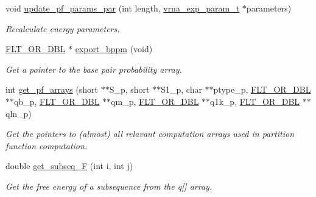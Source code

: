 \begin{DoxyCompactItemize}
void \mbox{\hyperlink{group__part__func__global__deprecated_gaafe2d1b21f5418b123b088aa395e827d}{update\+\_\+pf\+\_\+params\+\_\+par}} (int length, \mbox{\hyperlink{group__energy__parameters_ga01d8b92fe734df8d79a6169482c7d8d8}{vrna\+\_\+exp\+\_\+param\+\_\+t}} $\ast$parameters)
\begin{DoxyCompactList}\small\item\em Recalculate energy parameters. \end{DoxyCompactList}\item 
\mbox{\hyperlink{group__data__structures_ga31125aeace516926bf7f251f759b6126}{F\+L\+T\+\_\+\+O\+R\+\_\+\+D\+BL}} $\ast$ \mbox{\hyperlink{group__part__func__global__deprecated_gac5ac7ee281aae1c5cc5898a841178073}{export\+\_\+bppm}} (void)
\begin{DoxyCompactList}\small\item\em Get a pointer to the base pair probability array. \end{DoxyCompactList}\item 
int \mbox{\hyperlink{group__part__func__global__deprecated_ga42faebdfce6f070c5f89adfc8427525c}{get\+\_\+pf\+\_\+arrays}} (short $\ast$$\ast$S\+\_\+p, short $\ast$$\ast$S1\+\_\+p, char $\ast$$\ast$ptype\+\_\+p, \mbox{\hyperlink{group__data__structures_ga31125aeace516926bf7f251f759b6126}{F\+L\+T\+\_\+\+O\+R\+\_\+\+D\+BL}} $\ast$$\ast$qb\+\_\+p, \mbox{\hyperlink{group__data__structures_ga31125aeace516926bf7f251f759b6126}{F\+L\+T\+\_\+\+O\+R\+\_\+\+D\+BL}} $\ast$$\ast$qm\+\_\+p, \mbox{\hyperlink{group__data__structures_ga31125aeace516926bf7f251f759b6126}{F\+L\+T\+\_\+\+O\+R\+\_\+\+D\+BL}} $\ast$$\ast$q1k\+\_\+p, \mbox{\hyperlink{group__data__structures_ga31125aeace516926bf7f251f759b6126}{F\+L\+T\+\_\+\+O\+R\+\_\+\+D\+BL}} $\ast$$\ast$qln\+\_\+p)
\begin{DoxyCompactList}\small\item\em Get the pointers to (almost) all relavant computation arrays used in partition function computation. \end{DoxyCompactList}\item 
\mbox{\label{group__part__func__global__deprecated_ga189e2a1ec6cc32c53ea72f7543b0441e}} 
double \mbox{\hyperlink{group__part__func__global__deprecated_ga189e2a1ec6cc32c53ea72f7543b0441e}{get\+\_\+subseq\+\_\+F}} (int i, int j)
\begin{DoxyCompactList}\small\item\em Get the free energy of a subsequence from the q\mbox{[}\mbox{]} array. \end{DoxyCompactList}\item 
$$
\end{DoxyCompactItemize}
